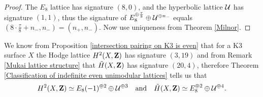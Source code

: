 \begin{proof}
    The $E_8$ lattice has signature $(8,0)$, and the hyperbolic lattice $\mathcal U$ has signature $(1,1)$, thus the signature of $E_8^{\oplus \frac{\tau}{8}} \oplus \mathcal U^{\oplus n_-}$ equals $(8\cdot \tfrac{\tau}{8} + n_-,n_-) = (n_+, n_-)$. Now use uniqueness from Theorem \ref{Milnor}.
\end{proof}

\begin{remark}
    We know from Proposition \ref{intersection pairing on K3 is even} that for a K3 surface $X$ the Hodge lattice $H^{2}(X, \mathbf Z)$ has signature $(3,19)$ and from Remark \ref{Mukai lattice structure} that $\,\tilde{\!{H}}(X, \mathbf Z)$ has signature $(20,4)$, therefore Theorem \ref{Classification of indefinite even unimodular lattices} tells us that
    \[
        H^{2}(X, \mathbf Z) \simeq E_8(-1)^{\oplus 2} \oplus \mathcal U^{\oplus 3} \quad \text{and} \quad
        \,\tilde{\!{H}}(X, \mathbf Z) \simeq E_8^{\oplus 2} \oplus \mathcal U^{\oplus 4}.
    \]
\end{remark}
